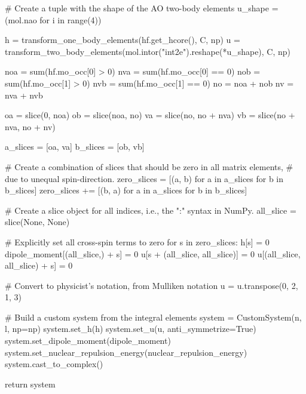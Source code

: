 \begin{python}
    # Create a tuple with the shape of the AO two-body elements
    u_shape = (mol.nao for i in range(4))

    h = transform_one_body_elements(hf.get_hcore(), C, np)
    u = transform_two_body_elements(mol.intor("int2e").reshape(*u_shape), C, np)

    noa = sum(hf.mo_occ[0] > 0)
    nva = sum(hf.mo_occ[0] == 0)
    nob = sum(hf.mo_occ[1] > 0)
    nvb = sum(hf.mo_occ[1] == 0)
    no = noa + nob
    nv = nva + nvb

    oa = slice(0, noa)
    ob = slice(noa, no)
    va = slice(no, no + nva)
    vb = slice(no + nva, no + nv)

    a_slices = [oa, va]
    b_slices = [ob, vb]

    # Create a combination of slices that should be zero in all matrix elements,
    # due to unequal spin-direction.
    zero_slices = [(a, b) for a in a_slices for b in b_slices]
    zero_slices += [(b, a) for a in a_slices for b in b_slices]

    # Create a slice object for all indices, i.e., the ":" syntax in NumPy.
    all_slice = slice(None, None)

    # Explicitly set all cross-spin terms to zero
    for s in zero_slices:
        h[s] = 0
        dipole_moment[(all_slice,) + s] = 0
        u[s + (all_slice, all_slice)] = 0
        u[(all_slice, all_slice) + s] = 0

    # Convert to physicist's notation, from Mulliken notation
    u = u.transpose(0, 2, 1, 3)

    # Build a custom system from the integral elements
    system = CustomSystem(n, l, np=np)
    system.set_h(h)
    system.set_u(u, anti_symmetrize=True)
    system.set_dipole_moment(dipole_moment)
    system.set_nuclear_repulsion_energy(nuclear_repulsion_energy)
    system.cast_to_complex()

    return system
\end{python}